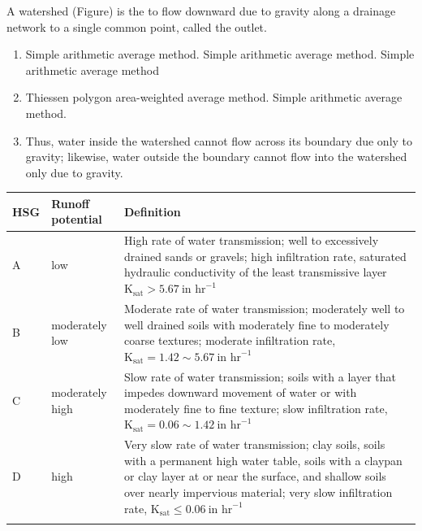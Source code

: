 A watershed (Figure) is the to flow downward due to gravity along a drainage network
to a single common point, called the outlet.

\begin{enumerate}[(3)]
\item[(1)] Simple arithmetic average method. Simple arithmetic average method. Simple arithmetic average method

\item[(2)] Thiessen polygon area-weighted average method. Simple arithmetic average method.

\item[(3)] Thus, water inside the watershed cannot flow across its boundary due only to gravity; likewise, water outside the boundary cannot flow into the
watershed only due to gravity.
\end{enumerate}

\lipsum[5]



\lipsum[5]

\begin{table}
{\begin{tabular*}{\textwidth}{@{\extracolsep{\fill}}ll@{\raggedright}p{20pc}@{}}
\dtoprule
HSG & Runoff potential & \multicolumn{1}{l}{Definition} \\
\midrule
A & low & \multicolumn{1}{p{20pc}}{\raggedright High rate of water transmission; well to excessively drained sands or gravels; high infiltration rate, saturated 
hydraulic conductivity of the least transmissive layer $\textrm{K}_{\textrm{sat}} > 5.67\ \textrm{in\ hr}^{-1}$} \\[6pt]
B & moderately low &
\multicolumn{1}{p{20pc}}{\raggedright Moderate rate of water transmission; moderately well to well drained soils with moderately fine to moderately coarse 
textures; moderate infiltration rate, $\textrm{K}_{\textrm{sat}} = 1.42 \sim 5.67\ \textrm{in\ hr}^{ -1}$} \\[6pt]
C& moderately high&
\multicolumn{1}{p{20pc}}{\raggedright Slow rate of water transmission; soils with a layer that impedes downward movement of water or with moderately fine to fine 
texture; slow infiltration rate, $\textrm{K}_{\textrm{sat}} = 0.06 \sim 1.42\ \textrm{in\ hr}^{-1}$} \\[6pt]
D& high&
\multicolumn{1}{p{20pc}}{\raggedright Very slow rate of water transmission; clay soils, soils with a permanent high water table, soils with a claypan or clay 
layer at or near the surface, and shallow soils over nearly impervious material; very slow infiltration rate, $\textrm{K}_{\textrm{sat}} \le 0.06\ \textrm{in\ 
hr}^{ -1}$} \\
\dbottomrule
\end{tabular*}}
{}
\end{table}

